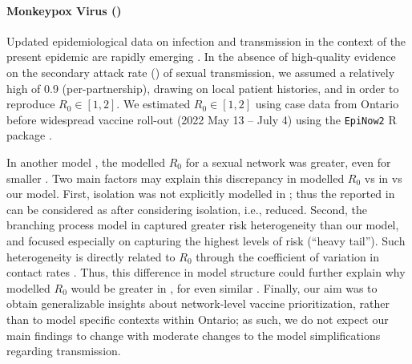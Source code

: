 \paragraph{Monkeypox Virus (\MPXV)}
Updated epidemiological data on \MPXV infection and transmission
in the context of the present epidemic are rapidly emerging \cite{Thornhill2022,PHO2022synth}.
In the absence of high-quality evidence on
the secondary attack rate (\SAR) of sexual transmission,
we assumed a relatively high \SAR of 0.9 (per-partnership),
drawing on local patient histories, and in order to reproduce $R_0 \in [1,2]$.
We estimated $R_0 \in [1,2]$ using \MPXV case data from Ontario \cite{PHO2022ont}
before widespread vaccine roll-out (2022 May 13 -- July 4)
using the \texttt{EpiNow2} R package \cite{EpiNow2}.
\par
In another model \cite{Endo2022},
the modelled $R_0$ for a \GBMSM sexual network was greater, even for smaller \SAR.
Two main factors may explain this discrepancy in
modelled $R_0$ vs \SAR in \cite{Endo2022} vs our model.
First, isolation was not explicitly modelled in \cite{Endo2022};
thus the reported \SAR in \cite{Endo2022} can be considered as
after considering isolation, i.e., reduced.
Second, the branching process model in \cite{Endo2022}
captured greater risk heterogeneity than our model,
and focused especially on capturing the highest levels of risk (``heavy tail'').
Such heterogeneity is directly related to $R_0$
through the coefficient of variation in contact rates \cite{Anderson1986}.
Thus, this difference in model structure could further explain why
modelled $R_0$ would be greater in \cite{Endo2022}, for even similar \SAR.
Finally, our aim was to obtain generalizable insights about network-level vaccine prioritization,
rather than to model specific contexts within Ontario;
as such, we do not expect our main findings to change
with moderate changes to the model simplifications regarding transmission.
